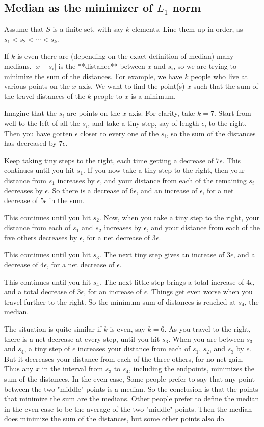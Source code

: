 \documentclass[12pt, letterpaper]{article}
\theoremstyle{definition}
\begin{document}
\subsection{Median as the minimizer of $L_1$ norm}
\label{medianMin}
Assume that $S$ is a finite set, with say $k$ elements. Line them up in order, as $s_1<s_2<\cdots <s_k$.  

If $k$ is even there are (depending on the exact definition of median) many medians. $|x-s_i|$ is the **distance** between $x$ and $s_i$, so we are trying to minimize the sum of the distances. For example, we have $k$ people who live at various points on the $x$-axis. We want to find the point(s) $x$ such that the sum of the travel distances of the $k$ people to $x$ is a minimum.

Imagine that the $s_i$ are points on the $x$-axis. For clarity, take $k=7$. Start from well to the left of all the $s_i$, and take a tiny step, say of length $\epsilon$, to the right. Then you have gotten $\epsilon$ closer to every one of the $s_i$, so the sum of the distances has decreased by $7\epsilon$. 

Keep taking tiny steps to the right, each time getting a decrease of $7\epsilon$. This continues until you hit $s_1$. If you now take a tiny step to the right, then your distance from $s_1$ increases by $\epsilon$, and your distance from each of the remaining $s_i$  decreases by $\epsilon$. So there is a decrease of $6\epsilon$, and an increase of $\epsilon$, for a net decrease of $5\epsilon$ in the sum. 

This continues until you hit $s_2$. Now, when you take a tiny step to the right, your distance from each of $s_1$ and $s_2$ increases by $\epsilon$, and your distance from each of the five others decreases by $\epsilon$, for a net decrease of $3\epsilon$.

This continues until you hit $s_3$. The next tiny step gives an increase of $3\epsilon$, and a decrease of $4\epsilon$, for a net decrease of $\epsilon$.

This continues until you hit $s_4$. The next little step brings a total increase of $4\epsilon$, and a total decrease of $3\epsilon$, for an increase of $\epsilon$. Things get even worse when you travel further to the right. So the minimum sum of distances is reached at $s_4$, the median.

The situation is quite similar if $k$ is even, say $k=6$. As you travel to the right, there is a net decrease at every step, until you hit $s_3$. When you are between $s_3$ and $s_4$, a tiny step of $\epsilon$ increases your distance from each of $s_1$, $s_2$, and $s_3$ by $\epsilon$. But it decreases your distance from each of the three others, for no net gain. Thus any $x$ in the interval from  $s_3$ to $s_4$, including the endpoints, minimizes the sum of the distances. In the even case, Some people prefer to say that any point between the two "middle" points is a median. So the conclusion is that the points that minimize the sum are the medians. Other people prefer to define the median in the even case to be the average of the two "middle" points. Then the median does minimize the sum of the distances, but some other points also do.
\end{document}
